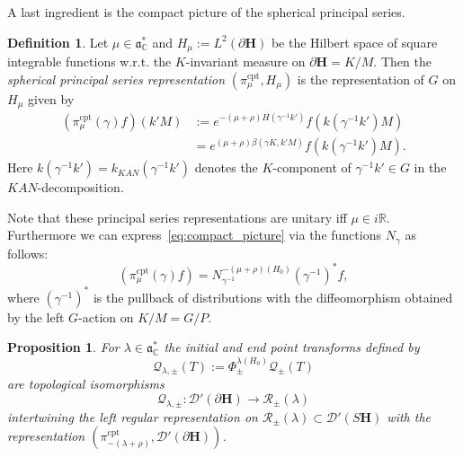 \documentclass[10pt]{amsart}
\newtheorem{prop}[cdrthm]{Proposition}
\theoremstyle{definition}
\newtheorem{defi}[cdrthm]{Definition}
\DeclareMathOperator{\cpt}{cpt}
\newcommand{\mc}{\mathcal}
\newcommand{\cc}{\mathbb{C}}
\newcommand{\bfh}{\mathbf{H}}
\newcommand{\pl}{\partial}
\newcommand{\R}{\mathbb R}
\renewcommand{\a}{\mathfrak a}
\begin{document}
A last ingredient is the compact picture of the spherical principal series.

\begin{defi}\label{prop:compact_pic}
Let $\mu\in\a^*_\cc$ and $H_\mu:= L^2(\pl{\bfh})$ be the Hilbert space of square integrable functions w.r.t. the $K$-invariant measure on $\pl{\bfh}=K/M$. Then the \emph{spherical principal series representation} $(\pi^{\cpt}_\mu, H_\mu)$ is the representation of $G$ on $H_\mu$ given by
\begin{align}\label{eq:compact_picture}
\left(\pi^{\cpt}_\mu(\gamma) f\right) (k'M) &:= e^{-(\mu+\rho)H(\gamma^{-1}k')}f\left(k\left(\gamma^{-1}k'\right)M\right)\\
&=\nonumber e^{(\mu+\rho)\beta(\gamma K,k'M)}f\left(k\left(\gamma^{-1}k'\right)M\right).
\end{align}
Here $k(\gamma^{-1}k')=k_{KAN}(\gamma^{-1}k')$ denotes the $K$-component of $\gamma^{-1}k'\in G$ in the $KAN$-decomposition.
\end{defi}

Note that these principal series representations are unitary iff $\mu\in i\R$. Furthermore we can express~\eqref{eq:compact_picture} via the functions $N_\gamma$ as follows:
\begin{equation}\label{eq:compact_picture_N_gamma}
\left(\pi^{\cpt}_\mu(\gamma) f\right)= N_{\gamma^{-1}}^{-(\mu+\rho)(H_0)}\left(\gamma^{-1}\right)^* f,
\end{equation}
where $(\gamma^{-1})^*$ is the pullback of distributions with the diffeomorphism obtained by the left $G$-action on $K/M=G/P$.

\begin{prop}\label{prop:classical_compact_intertwining}
For $\lambda \in \a^*_\cc$ the initial and end point transforms defined by
\begin{equation}\label{eq:Q_lambda_def}
\mathcal Q_{\lambda,\pm}(T) := \Phi_\pm^{\lambda(H_0)}\mathcal Q_\pm(T)
\end{equation}
are topological isomorphisms
\[
\mathcal Q_{\lambda,\pm}: \mathcal D'(\pl{\bfh})\to \mc{R}_\pm(\lambda)
\]
intertwining the left regular representation on $\mc{R}_\pm(\lambda) \subset \mc{D}'(S{\bfh})$ with the representation $(\pi^{\cpt}_{-(\lambda+\rho)},\mathcal D'(\pl{\bfh}))$.
\end{prop}
\end{document}
